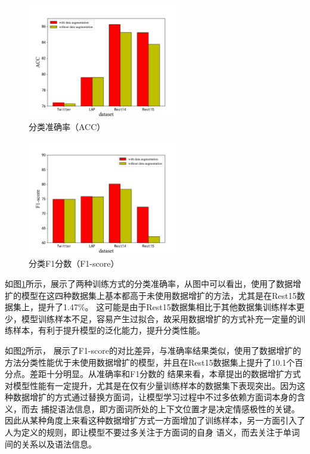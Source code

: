 \begin{figure}[htb]
    \setlength{\belowcaptionskip}{0pt}
    \centering
    \includegraphics[width=0.6\textwidth]{pic/DAACC.pdf}
    \caption{分类准确率（ACC）}
    \label{DAACC}
\end{figure}

\begin{figure}[htb]
    \setlength{\belowcaptionskip}{0pt}
    \centering
    \includegraphics[width=0.6\textwidth]{pic/DAF1.pdf}
    \caption{分类F1分数（F1-score）}
    \label{DAF1}
\end{figure}

如图\ref{DAACC}所示，展示了两种训练方式的分类准确率，从图中可以看出，使用了数据增扩的模型在这四种数据集上基本都高于未使用数据增扩的方法，尤其是在Rest15数据集上，提升了1.47\%。
这可能是由于Rest15数据集相比于其他数据集训练样本更少，模型训练样本不足，容易产生过拟合，故采用数据增扩的方式补充一定量的训练样本，有利于提升模型的泛化能力，提升分类性能。

如图\ref{DAF1}所示，
展示了F1-score的对比差异，与准确率结果类似，使用了数据增扩的方法分类性能优于未使用数据增扩的模型，并且在Rest15数据集上提升了10.1个百分点。差距十分明显。从准确率和F1分数的
结果来看，本章提出的数据增扩方式对模型性能有一定提升，尤其是在仅有少量训练样本的数据集下表现突出。因为这种数据增扩的方式通过替换方面词，让模型学习过程中不过多依赖方面词本身的含义，而去
捕捉语法信息，即方面词所处的上下文位置才是决定情感极性的关键。因此从某种角度上来看这种数据增扩方式一方面增加了训练样本，另一方面引入了人为定义的规则，即让模型不要过多关注于方面词的自身
语义，而去关注于单词间的关系以及语法信息。

